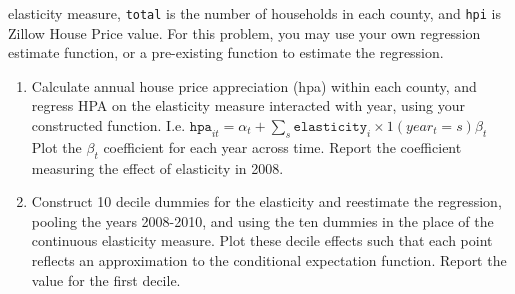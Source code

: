 \documentclass[11pt, a4paper]{article}
\begin{document}
\begin{enumerate}
  elasticity measure, \texttt\texttt{total} is the number of
  households in each county, and \texttt{hpi} is Zillow House Price
  value. For this problem, you may use your own regression estimate
  function, or a pre-existing function to estimate the regression.
  \begin{enumerate}
  \item Calculate annual house price appreciation (hpa) within each county, and regress HPA on the elasticity measure interacted with year, using your constructed function. I.e. $\texttt{hpa}_{it} = \alpha_{t} + \sum_{s}\texttt{elasticity}_{i}\times 1(year_{t} = s)\beta_{t}$ Plot the $\beta_{t}$ coefficient for each year across time. Report the coefficient measuring the effect of elasticity in 2008.
  \item Construct 10 decile dummies for the elasticity and reestimate the regression, pooling the years 2008-2010, and using the ten dummies in the place of the continuous elasticity measure. Plot these decile effects such that each point reflects an approximation to the conditional expectation function. Report the value for the first decile.
  \end{enumerate}
\end{enumerate}
\end{document}
